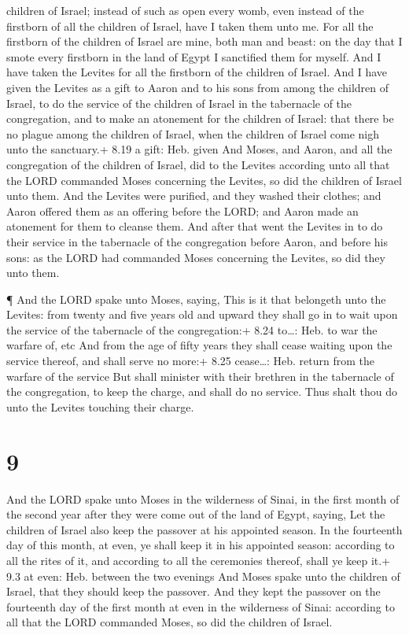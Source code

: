 children of Israel; instead of such as open every womb, even instead of
the firstborn of all the children of Israel, have I taken them unto me.
 For all the firstborn of the children of Israel are mine,
both man and beast: on the day that I smote every firstborn in the land
of Egypt I sanctified them for myself.  And I have taken
the Levites for all the firstborn of the children of Israel.
 And I have given the Levites as a gift to Aaron and to his
sons from among the children of Israel, to do the service of the
children of Israel in the tabernacle of the congregation, and to make an
atonement for the children of Israel: that there be no plague among the
children of Israel, when the children of Israel come nigh unto the
sanctuary.+ 8.19 a gift: Heb. given  And Moses, and Aaron,
and all the congregation of the children of Israel, did to the Levites
according unto all that the LORD commanded Moses concerning the Levites,
so did the children of Israel unto them.  And the Levites
were purified, and they washed their clothes; and Aaron offered them as
an offering before the LORD; and Aaron made an atonement for them to
cleanse them.  And after that went the Levites in to do
their service in the tabernacle of the congregation before Aaron, and
before his sons: as the LORD had commanded Moses concerning the Levites,
so did they unto them.

 ¶ And the LORD spake unto Moses, saying, 
This is it that belongeth unto the Levites: from twenty and five years
old and upward they shall go in to wait upon the service of the
tabernacle of the congregation:+ 8.24 to\ldots: Heb. to war the warfare
of, etc  And from the age of fifty years they shall cease
waiting upon the service thereof, and shall serve no more:+ 8.25
cease\ldots: Heb. return from the warfare of the service 
But shall minister with their brethren in the tabernacle of the
congregation, to keep the charge, and shall do no service. Thus shalt
thou do unto the Levites touching their charge.

\hypertarget{section-8}{%
\section{9}\label{section-8}}

 And the LORD spake unto Moses in the wilderness of Sinai,
in the first month of the second year after they were come out of the
land of Egypt, saying,  Let the children of Israel also keep
the passover at his appointed season.  In the fourteenth day
of this month, at even, ye shall keep it in his appointed season:
according to all the rites of it, and according to all the ceremonies
thereof, shall ye keep it.+ 9.3 at even: Heb. between the two evenings
 And Moses spake unto the children of Israel, that they
should keep the passover.  And they kept the passover on the
fourteenth day of the first month at even in the wilderness of Sinai:
according to all that the LORD commanded Moses, so did the children of
Israel.

